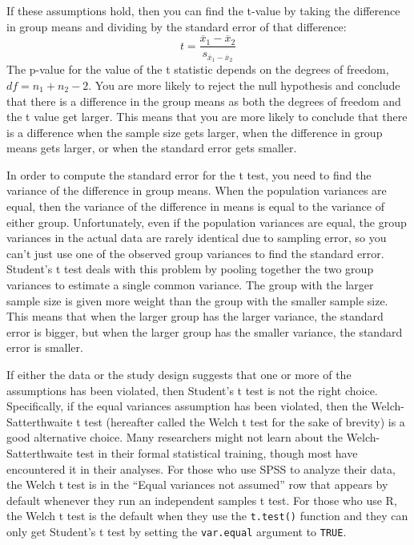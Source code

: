\documentclass[man,a4paper,noextraspace,apacite]{apa6}
\begin{document}
If these assumptions hold, then you can find the t-value by taking the difference in group means and dividing by the standard error of that difference:   
    \begin{equation}
    t = \frac{\overline{x}_1-\overline{x}_2}{s_{\overline{x}_1-\overline{x}_2}}
    \end{equation}
    The p-value for the value of the t statistic depends on the degrees of freedom, $df=n_1+n_2-2$. You are more likely to reject the null hypothesis and conclude that there is a difference in the group means as both the degrees of freedom and the t value get larger. This means that you are more likely to conclude that there is a difference when the sample size gets larger, when the difference in group means gets larger, or when the standard error gets smaller. 
    
    In order to compute the standard error for the t test, you need to find the variance of the difference in group means. When the population variances are equal, then the variance of the difference in means is equal to the variance of either group. Unfortunately, even if the population variances are equal, the group variances in the actual data are rarely identical due to sampling error, so you can't just use one of the observed group variances to find the standard error. Student's t test deals with this problem by pooling together the two group variances to estimate a single common variance. The group with the larger sample size is given more weight than the group with the smaller sample size. This means that when the larger group has the larger variance, the standard error is bigger, but when the larger group has the smaller variance, the standard error is smaller.

    If either the data or the study design suggests that one or more of the assumptions has been violated, then Student's t test is not the right choice. Specifically, if the equal variances assumption has been violated, then the Welch-Satterthwaite t test (hereafter called the Welch t test for the sake of brevity) is a good alternative choice. Many researchers might not learn about the Welch-Satterthwaite test in their formal statistical training, though most have encountered it in their analyses. For those who use SPSS to analyze their data, the Welch t test is in the ``Equal variances not assumed'' row that appears by default whenever they run an independent samples t test. For those who use R, the Welch t test is the default when they use the \texttt{t.test()} function and they can only get Student's t test by setting the \texttt{var.equal} argument to \texttt{TRUE}.
    
\end{document}

